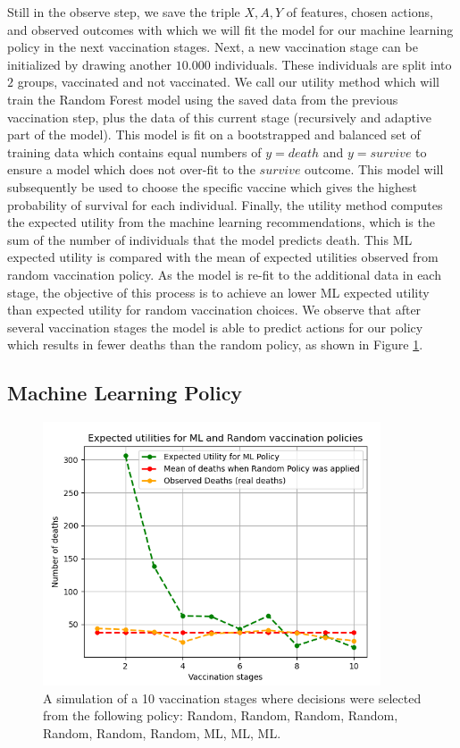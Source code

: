 \documentclass{article}
\begin{document}
Still in the observe step, we save the triple $X, A, Y$ of features, chosen actions, and observed outcomes with which we will fit the model for our machine learning policy in the next vaccination stages. Next, a new vaccination stage can be initialized by drawing another $10.000$ individuals. These individuals are split into $2$ groups, vaccinated and not vaccinated. We call our utility method which will train the Random Forest model using the saved data from the previous vaccination step, plus the data of this current stage (recursively and adaptive part of the model). This model is fit on a bootstrapped and balanced set of training data which contains equal numbers of $y = death$ and $y = survive$ to ensure a model which does not over-fit to the $survive$ outcome. This model will subsequently be used to choose the specific vaccine which gives the highest probability of survival for each individual. Finally, the utility method computes the expected utility from the machine learning recommendations, which is the sum of the number of individuals that the model predicts death. This ML expected utility is compared with the mean of expected utilities observed from random vaccination policy. As the model is re-fit to the additional data in each stage, the objective of this process is to achieve an lower ML expected utility than expected utility for random vaccination choices. We observe that after several vaccination stages the model is able to predict actions for our policy which results in fewer deaths than the random policy, as shown in Figure \ref{fig: expected utility plot for each stage}.

\subsection{Machine Learning Policy}
\label{sec: Machine Learning Policy}

\begin{figure}[H]
\includegraphics[width=10cm]{pictures/expected_utility_plot_for_each_stage.png}
    \centering
    \caption{A simulation of a 10 vaccination stages where decisions were selected from the following policy: Random, Random, Random, Random, Random, Random, Random, ML, ML, ML.}
    \label{fig: expected utility plot for each stage}
\end{figure}
\end{document}
